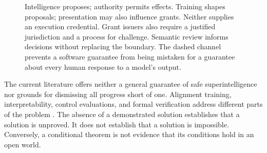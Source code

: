 \begin{figure}[t]
\centering
{}
\caption{Intelligence proposes; authority permits effects. Training shapes proposals; presentation may also influence grants. Neither supplies an execution credential. Grant issuers also require a justified jurisdiction and a process for challenge. Semantic review informs decisions without replacing the boundary. The dashed channel prevents a software guarantee from being mistaken for a guarantee about every human response to a model's output.}
\label{fig:architecture}
\end{figure}

The current literature offers neither a general guarantee of safe superintelligence nor grounds for dismissing all progress short of one. Alignment training, interpretability, control evaluations, and formal verification address different parts of the problem \cite{iasr,control,gsai}. The absence of a demonstrated solution establishes that a solution is unproved. It does not establish that a solution is impossible. Conversely, a conditional theorem is not evidence that its conditions hold in an open world.

